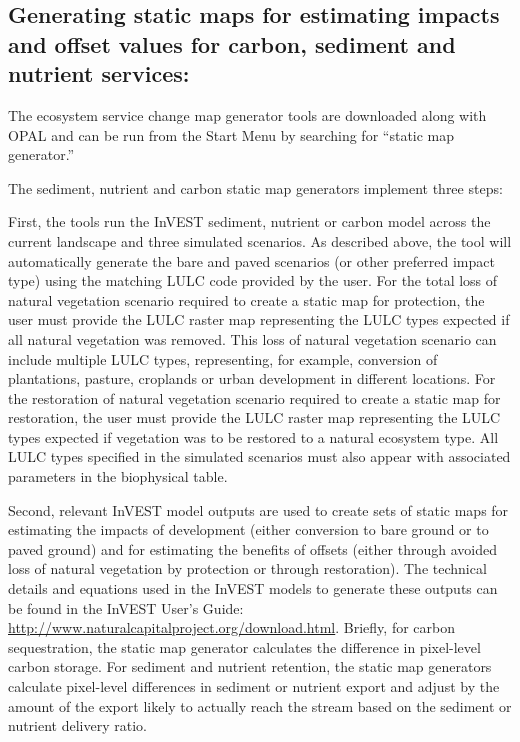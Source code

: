 \documentclass[11pt,letterpaper]{report}
\begin{document}
	\subsection*{Generating static maps for estimating impacts and offset values for carbon, sediment and nutrient services:}
	
	The ecosystem service change map generator tools are downloaded along with OPAL and can be run from the Start Menu by searching for ``static map generator.''
	 
	The sediment, nutrient and carbon static map generators implement three steps:
	
	First, the tools run the InVEST sediment, nutrient or carbon model across the current landscape and three simulated scenarios. As described above, the tool will automatically generate the bare and paved scenarios (or other preferred impact type) using the matching LULC code provided by the user. For the total loss of natural vegetation scenario required to create a static map for protection, the user must provide the LULC raster map representing the LULC types expected if all natural vegetation was removed. This loss of natural vegetation scenario can include multiple LULC types, representing, for example, conversion of plantations, pasture, croplands or urban development in different locations. For the restoration of natural vegetation scenario required to create a static map for restoration, the user must provide the LULC raster map representing the LULC types expected if vegetation was to be restored to a natural ecosystem type. All LULC types specified in the simulated scenarios must also appear with associated parameters in the biophysical table. 
	
	Second, relevant InVEST model outputs are used to create sets of static maps for estimating the impacts of development (either conversion to bare ground or to paved ground) and for estimating the benefits of offsets (either through avoided loss of natural vegetation by protection or through restoration). The technical details and equations used in the InVEST models to generate these outputs can be found in the InVEST User's Guide: \url{http://www.naturalcapitalproject.org/download.html}. Briefly, for carbon sequestration, the static map generator calculates the difference in pixel-level carbon storage. For sediment and nutrient retention, the static map generators calculate pixel-level differences in sediment or nutrient export and adjust by the amount of the export likely to actually reach the stream based on the sediment or nutrient delivery ratio. 
	
\end{document}
